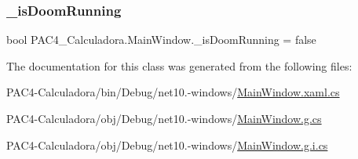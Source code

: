 \mbox{\label{class_p_a_c4___calculadora_1_1_main_window_a8edb84cff8d4d0c9e105264681e963f2}} 
\subsubsection{\texorpdfstring{\+\_\+is\+Doom\+Running}{\_isDoomRunning}}
{\footnotesize\ttfamily bool P\+A\+C4\+\_\+\+Calculadora.\+Main\+Window.\+\_\+is\+Doom\+Running = false\hspace{0.3cm}{\ttfamily [private]}}



The documentation for this class was generated from the following files\+:\begin{DoxyCompactItemize}
\item 
P\+A\+C4-\/\+Calculadora/bin/\+Debug/net10.-\/windows/\mbox{\hyperlink{bin_2_debug_2net10_80-windows_2_main_window_8xaml_8cs}{Main\+Window.\+xaml.\+cs}}\item 
P\+A\+C4-\/\+Calculadora/obj/\+Debug/net10.-\/windows/\mbox{\hyperlink{_main_window_8g_8cs}{Main\+Window.\+g.\+cs}}\item 
P\+A\+C4-\/\+Calculadora/obj/\+Debug/net10.-\/windows/\mbox{\hyperlink{_main_window_8g_8i_8cs}{Main\+Window.\+g.\+i.\+cs}}\end{DoxyCompactItemize}
